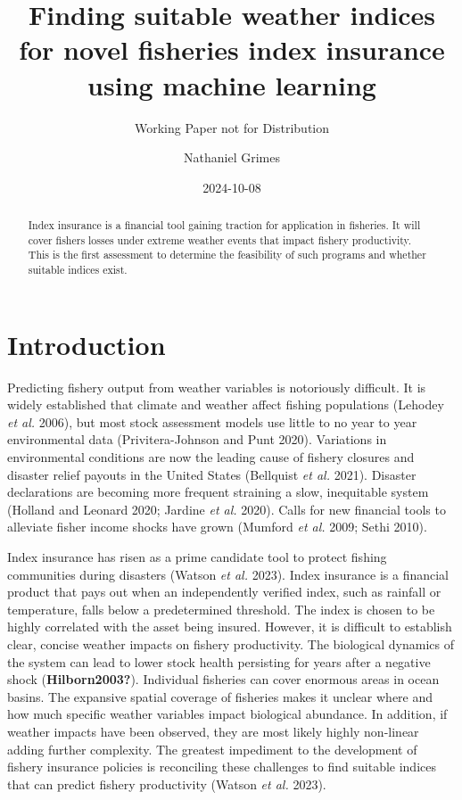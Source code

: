 \documentclass[
  letterpaper,
  DIV=11,
  numbers=noendperiod]{scrartcl}
\title{Finding suitable weather indices for novel fisheries index
insurance using machine learning}
\subtitle{Working Paper not for Distribution}
\author{Nathaniel Grimes}
\date{2024-10-08}
\renewcommand*\contentsname{Table of contents}
\newcommand\contentsname{Table of contents}
\begin{document}
\maketitle
\begin{abstract}
Index insurance is a financial tool gaining traction for application in
fisheries. It will cover fishers losses under extreme weather events
that impact fishery productivity. This is the first assessment to
determine the feasibility of such programs and whether suitable indices
exist.
\end{abstract}
\ifdefined\Shaded\renewenvironment{Shaded}{\begin{tcolorbox}[boxrule=0pt, frame hidden, interior hidden, sharp corners, breakable, borderline west={3pt}{0pt}{shadecolor}, enhanced]}{\end{tcolorbox}}\fi

\renewcommand*\contentsname{Table of contents}
{
\hypersetup{linkcolor=}
\setcounter{tocdepth}{3}
\tableofcontents
}
\hypertarget{introduction}{%
\section{Introduction}\label{introduction}}

Predicting fishery output from weather variables is notoriously
difficult. It is widely established that climate and weather affect
fishing populations (Lehodey \emph{et al.} 2006), but most stock
assessment models use little to no year to year environmental data
(Privitera-Johnson and Punt 2020). Variations in environmental
conditions are now the leading cause of fishery closures and disaster
relief payouts in the United States (Bellquist \emph{et al.} 2021).
Disaster declarations are becoming more frequent straining a slow,
inequitable system (Holland and Leonard 2020; Jardine \emph{et al.}
2020). Calls for new financial tools to alleviate fisher income shocks
have grown (Mumford \emph{et al.} 2009; Sethi 2010).

Index insurance has risen as a prime candidate tool to protect fishing
communities during disasters (Watson \emph{et al.} 2023). Index
insurance is a financial product that pays out when an independently
verified index, such as rainfall or temperature, falls below a
predetermined threshold. The index is chosen to be highly correlated
with the asset being insured. However, it is difficult to establish
clear, concise weather impacts on fishery productivity. The biological
dynamics of the system can lead to lower stock health persisting for
years after a negative shock (\textbf{Hilborn2003?}). Individual
fisheries can cover enormous areas in ocean basins. The expansive
spatial coverage of fisheries makes it unclear where and how much
specific weather variables impact biological abundance. In addition, if
weather impacts have been observed, they are most likely highly
non-linear adding further complexity. The greatest impediment to the
development of fishery insurance policies is reconciling these
challenges to find suitable indices that can predict fishery
productivity (Watson \emph{et al.} 2023).
\end{document}
